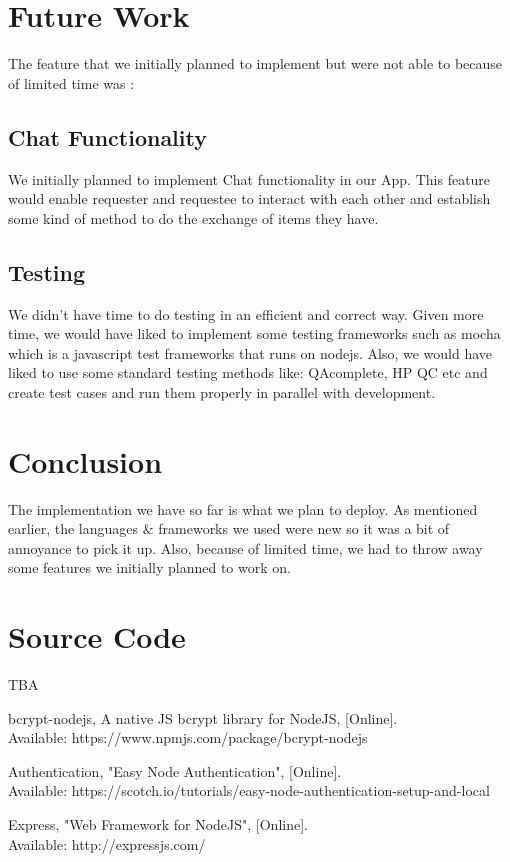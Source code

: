 \documentclass[a4paper]{article}
\begin{document}
\section{Future Work}
The feature that we initially planned to implement but were not able to because of limited time was : 
\subsection{Chat Functionality} We initially planned to implement Chat functionality in our App. This feature would enable requester and requestee to interact with each other and establish some kind of method to do the exchange of items they have.
\subsection{Testing} We didn't have time to do testing in an efficient and correct way. Given more time, we would have liked to implement some testing frameworks such as mocha which is a javascript test frameworks that runs on nodejs. Also, we would have liked to use some standard testing methods like: QAcomplete, HP QC etc and create test cases and run them properly in parallel with development.

\section{Conclusion} 
The implementation we have so far is what we plan to deploy. As mentioned earlier, the languages \& frameworks we used were new so it was a bit of annoyance to pick it up. Also, because of limited time, we had to throw away some features we initially planned to work on. 

\section{Source Code}
TBA

\begin{thebibliography}{}	  
    
    bcrypt-nodejs,  A native JS bcrypt library for NodeJS, [Online].\\
    Available: https://www.npmjs.com/package/bcrypt-nodejs
    
    Authentication, "Easy Node Authentication", [Online]. \\
    Available: https://scotch.io/tutorials/easy-node-authentication-setup-and-local
    
    Express, "Web Framework for NodeJS", [Online]. \\
    Available: http://expressjs.com/
    
\end{thebibliography}
\end{document}
